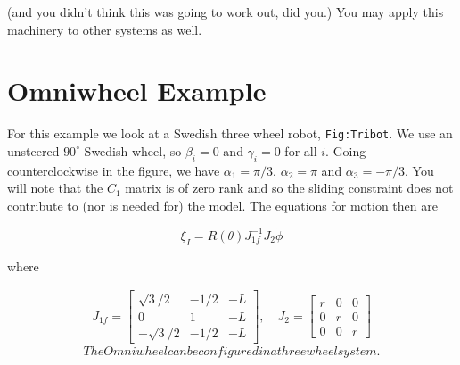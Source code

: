 (and you didn't think this was going to work out, did you.) You may
apply this machinery to other systems as well.

\hypertarget{omniwheel-example}{%
\section{Omniwheel Example}\label{omniwheel-example}}

For this example we look at a Swedish three wheel robot,
\texttt{Fig:Tribot}. We use an unsteered \(90^\circ\) Swedish wheel, so
\(\beta_i =0\) and \(\gamma_i = 0\) for all \(i\). Going
counterclockwise in the figure, we have \(\alpha_1 = \pi/3\),
\(\alpha_2 = \pi\) and \(\alpha_3 = -\pi/3\). You will note that the
\(C_1\) matrix is of zero rank and so the sliding constraint does not
contribute to (nor is needed for) the model. The equations for motion
then are

\[\dot{\xi}_I = R(\theta) J^{-1}_{1f}J_2\dot{\phi}\]

where

\[\begin{aligned}
J_{1f} = \begin{bmatrix} \sqrt{3}/2 & -1/2 & -L \\ 0 & 1 & -L \\ -\sqrt{3}/2 & -1/2 & -L \end{bmatrix},
 \quad
J_2 = \begin{bmatrix} r & 0 & 0 \\ 0 & r & 0 \\ 0 & 0 & r \end{bmatrix}
\end{aligned}\]\[The Omniwheel can be configured in a three wheel system.\]
